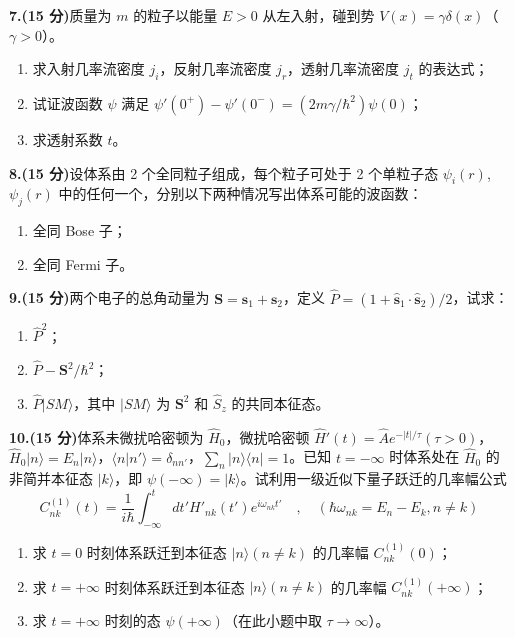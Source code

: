 \textbf{7.(15 分)}质量为 $m$ 的粒子以能量 $E > 0$ 从左入射，碰到势 $V(x) = \gamma \delta(x)$（$\gamma > 0$）。

\begin{enumerate}
    \item 求入射几率流密度 $j_i$，反射几率流密度 $j_r$，透射几率流密度 $j_t$ 的表达式；
    \item 试证波函数 $\psi$ 满足 $\psi'(0^+) - \psi'(0^-) = (2m\gamma/\hbar^2)\psi(0)$；
    \item 求透射系数 $t$。
\end{enumerate}

\textbf{8.(15 分)}设体系由 2 个全同粒子组成，每个粒子可处于 2 个单粒子态 $\psi_i(r)$, $\psi_j(r)$ 中的任何一个，分别以下两种情况写出体系可能的波函数：

\begin{enumerate}
    \item 全同 Bose 子；
    \item 全同 Fermi 子。
\end{enumerate}

\textbf{9.(15 分)}两个电子的总角动量为 $\mathbf{S} = \mathbf{s}_1 + \mathbf{s}_2$，定义 $\hat{P} = (1 + \hat{\mathbf{s}}_1 \cdot \hat{\mathbf{s}}_2)/2$，试求：

\begin{enumerate}
    \item  $\hat{P}^2$；
    \item  $\hat{P} - \mathbf{S}^2/\hbar^2$；
    \item  $\hat{P}|SM\rangle$，其中 $|SM\rangle$ 为 $\mathbf{S}^2$ 和 $\hat{S}_z$ 的共同本征态。
\end{enumerate}

\textbf{10.(15 分)}体系未微扰哈密顿为 $\hat{H}_0$，微扰哈密顿 $\hat{H}'(t) = \hat{A}e^{-|t|/\tau}(\tau > 0)$，$\hat{H}_0|n\rangle = E_n |n\rangle$，$\langle n|n'\rangle = \delta_{nn'}$，$\sum_n |n\rangle \langle n| = 1$。已知 $t = -\infty$ 时体系处在 $\hat{H}_0$ 的非简并本征态 $|k\rangle$，即 $\psi(-\infty) = |k\rangle$。试利用一级近似下量子跃迁的几率幅公式
\[
C_{nk}^{(1)}(t) = \frac{1}{i\hbar} \int_{-\infty}^{t} dt' H'_{nk}(t') e^{i\omega_{nk}t'} \quad , \quad (\hbar\omega_{nk} = E_n - E_k, n \neq k)~
\]
\begin{enumerate}
    \item  求 $t = 0$ 时刻体系跃迁到本征态 $|n\rangle (n \neq k)$ 的几率幅 $C_{nk}^{(1)}(0)$；
    \item  求 $t = +\infty$ 时刻体系跃迁到本征态 $|n\rangle (n \neq k)$ 的几率幅 $C_{nk}^{(1)}(+\infty)$；
    \item  求 $t = +\infty$ 时刻的态 $\psi(+\infty)$（在此小题中取 $\tau \to \infty$）。
\end{enumerate}